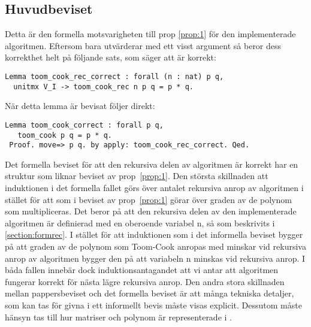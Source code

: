 \subsection{Huvudbeviset}
Detta är den formella motsvarigheten till prop \ref{prop:1} för den
implementerade algoritmen. Eftersom  bara utvärderar
 med ett visst argument så beror dess korrekthet helt på
följande sats, som säger att  är korrekt:
\begin{lstlisting}
Lemma toom_cook_rec_correct : forall (n : nat) p q,
  unitmx V_I -> toom_cook_rec n p q = p * q.
\end{lstlisting}
När detta lemma är bevisat följer  direkt:
\begin{lstlisting}
Lemma toom_cook_correct : forall p q,
   toom_cook p q = p * q.
 Proof. move=> p q. by apply: toom_cook_rec_correct. Qed.
\end{lstlisting}
Det formella beviset för att den rekursiva delen av algoritmen är korrekt har
en struktur som liknar beviset av prop~\ref{prop:1}.
Den största skillnaden att induktionen i det formella fallet görs över antalet
rekursiva anrop av algoritmen i stället för att som i beviset av
prop~\ref{prop:1} görar över graden av de polynom som multipliceras. Det beror
på att den rekursiva delen av den implementerade algoritmen 
är definierad med en oberoende variabel n, så som beskrivits i
\ref{section:formrec}. I stället för att induktionen som i det informella
beviset bygger på att graden av de polynom som Toom-Cook anropas med minskar
vid rekursiva anrop av algoritmen bygger den på att variabeln n minskas vid
rekursiva anrop. I båda fallen innebär dock induktionsantagandet att vi antar
att algoritmen fungerar korrekt för nästa lägre rekursiva anrop.
Den andra stora skillnaden mellan pappersbeviset och det formella beviset är
att många tekniska detaljer, som kan tas för givna i ett informellt bevis måste
visas explicit. Dessutom måste hänsyn tas till hur matriser och polynom är
representerade i \ssr.


